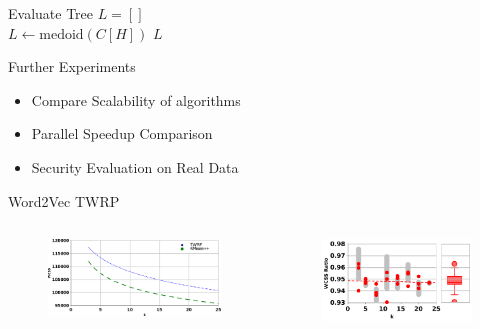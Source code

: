 \documentclass[12pt]{beamer}
\begin{document}
\begin{frame}[plain]{Evaluate Tree}
\DontPrintSemicolon
{}
{
}
$L=[]$\\
{
	  $L \leftarrow \text{medoid}(C[H])$
}
\Return $L$
\end{frame}


\begin{frame}[plain]{Further Experiments}
 \begin{itemize}
  \item Compare Scalability of algorithms
  \item Parallel Speedup Comparison
  \item Security Evaluation on Real Data
 \end{itemize}
\end{frame} 

\begin{frame}[plain]{Word2Vec TWRP}
\begin{columns}
 \begin{column}{0.65\textwidth} 
 \begin{figure}
 \centerline{\includegraphics[width=1\textwidth]{figs/w2vwcss}}
\end{figure}
\end{column}
 \begin{column}{0.35\textwidth} 
 \begin{figure}
 \centerline{\includegraphics[width=1.3\textwidth]{figs/w2vratio_wcss}}
\end{figure}
\end{column}
\end{columns}
\end{frame}
\end{document}
